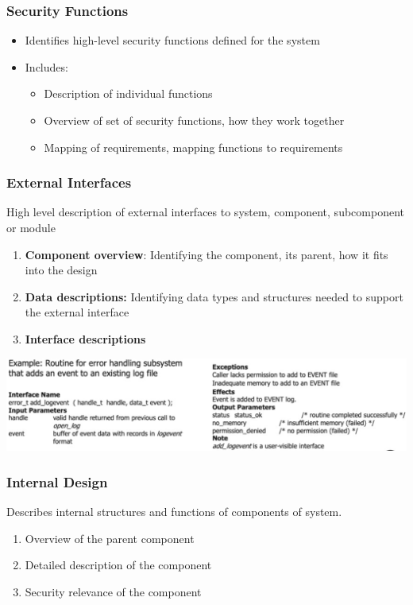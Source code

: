 \subsubsection{Security Functions}
\begin{itemize}
    \item Identifies high-level security functions defined for the system
    \item Includes:
    \begin{itemize}
        \item Description of individual functions
        \item Overview of set of security functions, how they work together
        \item Mapping of requirements, mapping functions to requirements
    \end{itemize}
\end{itemize}

\subsubsection{External Interfaces}
High level description of external interfaces to system, component, subcomponent or module
\begin{enumerate}
    \item \textbf{Component overview}: Identifying the component, its parent, how it fits into the design
    \item \textbf{Data descriptions:} Identifying data types and structures needed to support the external interface
    \item \textbf{Interface descriptions}
\end{enumerate}
\includegraphics[width=\linewidth]{../img/external_interface.png}

\subsubsection{Internal Design}
Describes internal structures and functions of components of system.
\begin{enumerate}
    \item Overview of the parent component
    \item Detailed description of the component
    \item Security relevance of the component
\end{enumerate}


